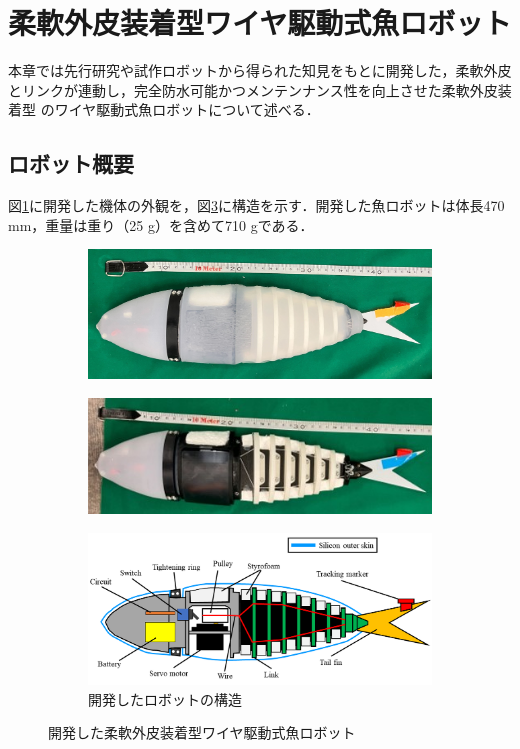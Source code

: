 \newpage

\section{柔軟外皮装着型ワイヤ駆動式魚ロボット}
本章では先行研究\cite{kyu}や試作ロボットから得られた知見をもとに開発した，柔軟外皮とリンクが連動し，完全防水可能かつメンテンナンス性を向上させた柔軟外皮装着型
のワイヤ駆動式魚ロボットについて述べる．
\subsection{ロボット概要}
図\ref{fig:fishrobo_with}に開発した機体の外観を，図\ref{fig:kouzou}に構造を示す．開発した魚ロボットは体長470 mm，重量は重り（25 g）を含めて710 gである．
\begin{figure}[htbp]
    \centering  
    \begin{subfigure}[b]{0.85\linewidth}
        \centering
        \includegraphics[width=0.9\linewidth]{chapters/picture/withskin.jpg}
        \label{fig:fishrobo_with}
    \end{subfigure}
    \begin{subfigure}[b]{0.85\linewidth}
        \centering
        \includegraphics[width=0.9\linewidth]{chapters/picture/without_skin.jpg}
        \label{fig:fishrobo_less}
    \end{subfigure}
    \begin{subfigure}[b]{0.85\linewidth}
        \centering
        \includegraphics[width=0.9\linewidth]{chapters/picture/fish.png}
        \caption{開発したロボットの構造}
        \label{fig:kouzou}
    \end{subfigure}
    \caption{開発した柔軟外皮装着型ワイヤ駆動式魚ロボット}
    \label{fig:gaikan}
\end{figure}
